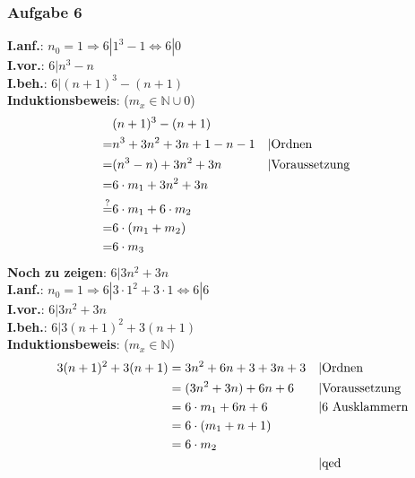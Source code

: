 \subsubsection{Aufgabe 6}
\textbf{I.anf.}: $ n_0 = 1  \Rightarrow 6|1^3-1  \Leftrightarrow 6|0$\\
\textbf{I.vor.}: $ 6 | n^3 - n $\\
\textbf{I.beh.}: $ 6 | (n+1)^3 - (n+1) $\\
\textbf{Induktionsbeweis}: ($m_x \in \mathbb{N}\cup{0}$)\begin{align*}
&(n+1)^3 - (n+1) \\
= &n^3+3n^2+3n+1-n-1 			&& \text{\textbar Ordnen}\\
								= &(n^3 - n) + 3n^2 + 3n 	&& \text{\textbar Voraussetzung}\\
								= &6 \cdot m_1 + 3n^2 + 3n \\
								\stackrel{?}{=} &6 \cdot m_1 + 6 \cdot m_2 \\
								= &6 \cdot (m_1 + m_2) \\
								= &6 \cdot m_3  					\end{align*}
\textbf{Noch zu zeigen}: $ 6 | 3n^2 + 3n $\\
\textbf{I.anf.}: $ n_0 = 1 \Rightarrow 6|3\cdot1^2+3\cdot1 \Leftrightarrow 6|6$\\
\textbf{I.vor.}: $ 6 | 3n^2 + 3n $\\
\textbf{I.beh.}: $ 6 | 3(n+1)^2 + 3(n+1) $\\
\textbf{Induktionsbeweis}: ($m_x \in \mathbb{N}$)\begin{align*}
3(n+1)^2 + 3(n+1) &= 3n^2+6n+3+3n+3 			&& \text{\textbar Ordnen}\\
									&= (3n^2 + 3n) + 6n + 6 && \text{\textbar Voraussetzung}\\
									&= 6 \cdot m_1 + 6n + 6 && \text{\textbar $6$ Ausklammern}\\
									&= 6 \cdot (m_1 + n + 1)\\
									&= 6 \cdot m_2 					\\
									&												&& \text{\textbar qed}\end{align*}
